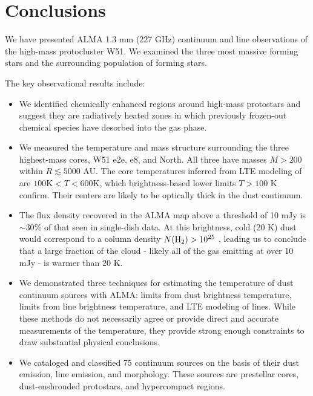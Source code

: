\documentclass{emulateapj}
\begin{document}
\section{Conclusions}
\label{sec:conclusion}

We have presented ALMA 1.3 mm (227 GHz) continuum and line observations of the
high-mass protocluster W51.  We examined the three most massive forming stars
and the surrounding population of forming stars.  


The key observational results include:
\begin{itemize}
    \item We identified chemically enhanced regions around high-mass protostars
        and suggest they are radiatively heated zones in which previously
        frozen-out chemical species have desorbed into the gas phase.
    \item We measured the temperature and mass structure surrounding the three
        highest-mass cores, W51 e2e, e8, and North.  All three have masses
        $M>200$ \msun within $R\lesssim5000$ AU.  The core temperatures
        inferred from LTE modeling of \methanol are $100 \mathrm{K} < T < 600
        \mathrm{K}$, which brightness-based lower limits $T>100$ K confirm.
        Their centers are likely to be optically thick in the dust continuum.
    \item The flux density recovered in the ALMA map above a threshold of 10
        mJy \perbeam is $\sim30\%$ of that seen in single-dish data.  At this
        brightness, cold (20 K) dust would correspond to a column density
        $N(\textrm{H}_{2})>10^{25}$ \persc, leading us to conclude that a large fraction
        of the cloud - likely all of the gas emitting at over 10 mJy \perbeam -
        is warmer than 20 K.
    \item We demonstrated three techniques for estimating the temperature of
        dust continuum sources with ALMA: limits from dust brightness
        temperature, limits from line brightness temperature, and LTE modeling
        of \methanol lines.  While these methods do not necessarily agree
        or provide direct and accurate measurements of the temperature, they
        provide strong enough constraints to draw substantial physical conclusions.
    \item We cataloged and classified 75 continuum sources on the basis of their
        dust emission, line emission, and morphology.  These sources are
        prestellar cores, dust-enshrouded protostars, and hypercompact \hii
        regions.
\end{itemize}
\end{document}
